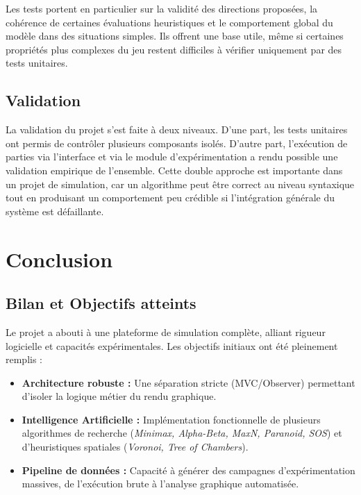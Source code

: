 \documentclass[11pt,a4paper]{article}
\begin{document}
Les tests portent en particulier sur la validité des directions proposées, la cohérence de certaines évaluations heuristiques et le comportement global du modèle dans des situations simples. Ils offrent une base utile, même si certaines propriétés plus complexes du jeu restent difficiles à vérifier uniquement par des tests unitaires.

\subsection{Validation}

La validation du projet s'est faite à deux niveaux. D'une part, les tests unitaires ont permis de contrôler plusieurs composants isolés. D'autre part, l'exécution de parties via l'interface et via le module d'expérimentation a rendu possible une validation empirique de l'ensemble. Cette double approche est importante dans un projet de simulation, car un algorithme peut être correct au niveau syntaxique tout en produisant un comportement peu crédible si l'intégration générale du système est défaillante.

\section{Conclusion}

\subsection{Bilan et Objectifs atteints}
Le projet a abouti à une plateforme de simulation complète, alliant rigueur logicielle et capacités expérimentales. Les objectifs initiaux ont été pleinement remplis :
\begin{itemize}
    \item \textbf{Architecture robuste :} Une séparation stricte (MVC/Observer) permettant d'isoler la logique métier du rendu graphique.
    \item \textbf{Intelligence Artificielle :} Implémentation fonctionnelle de plusieurs algorithmes de recherche (\textit{Minimax, Alpha-Beta, MaxN, Paranoid, SOS}) et d'heuristiques spatiales (\textit{Voronoi, Tree of Chambers}).
    \item \textbf{Pipeline de données :} Capacité à générer des campagnes d'expérimentation massives, de l'exécution brute à l'analyse graphique automatisée.
\end{itemize}
\end{document}
